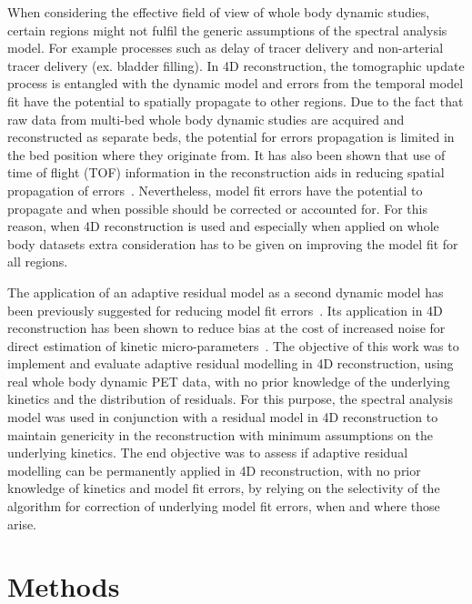 When considering the effective field of view of whole body dynamic studies, certain regions might not fulfil the generic assumptions of the spectral analysis model. For example processes such as delay of tracer delivery and non-arterial tracer delivery (ex. bladder filling).
In 4D reconstruction, the tomographic update process is entangled with the dynamic model and errors from the temporal model fit have the potential to spatially propagate to other regions. Due to the fact that raw data from multi-bed whole body dynamic studies are acquired and reconstructed as separate beds, the potential for errors propagation is limited in the bed position where they originate from. It has also been shown that use of time of flight (TOF) information in the reconstruction aids in reducing spatial propagation of errors~\cite{Kotasidis2016a}. Nevertheless, model fit errors have the potential to propagate and when possible should be corrected or accounted for. For this reason, when 4D reconstruction is used and especially when applied on whole body datasets extra consideration has to be given on improving the model fit for all regions.

The application of an adaptive residual model as a second dynamic model has been previously suggested for reducing model fit errors~\cite{Matthews2012}. Its application in 4D reconstruction has been shown to reduce bias at the cost of increased noise for direct estimation of kinetic micro-parameters~\cite{Kotasidis2014c}.
The objective of this work was to implement and evaluate adaptive residual modelling in 4D reconstruction, using real whole body dynamic PET data, with no prior knowledge of the underlying kinetics and the distribution of residuals. For this purpose, the spectral analysis model was used in conjunction with a residual model in 4D reconstruction to maintain genericity in the reconstruction with minimum assumptions on the underlying kinetics. 
The end objective was to assess if adaptive residual modelling can be permanently applied in 4D reconstruction, with no prior knowledge of kinetics and model fit errors, by relying on the selectivity of the algorithm for correction of underlying model fit errors, when and where those arise. 

\section{Methods}
